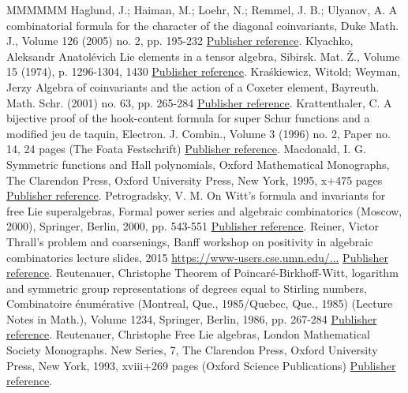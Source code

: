 \begin{thebibliography}{MMMMMM}
 Haglund, J.; Haiman, M.; Loehr, N.; Remmel, J. B.; Ulyanov, A. A combinatorial formula for the character of the diagonal coinvariants, Duke Math. J., Volume 126 (2005) no. 2, pp. 195-232 \href{https://alco.centre-mersenne.org/articles/10.5802/alco.421/#HHLRU}{Publisher reference}.
 Klyachko, Aleksandr Anatolévich Lie elements in a tensor algebra, Sibirsk. Mat. Ž., Volume 15 (1974), p. 1296-1304, 1430 \href{https://alco.centre-mersenne.org/articles/10.5802/alco.421/#Kly}{Publisher reference}.
 Kraśkiewicz, Witold; Weyman, Jerzy Algebra of coinvariants and the action of a Coxeter element, Bayreuth. Math. Schr. (2001) no. 63, pp. 265-284 \href{https://alco.centre-mersenne.org/articles/10.5802/alco.421/#KW}{Publisher reference}.
 Krattenthaler, C. A bijective proof of the hook-content formula for super Schur functions and a modified jeu de taquin, Electron. J. Combin., Volume 3 (1996) no. 2, Paper no. 14, 24 pages (The Foata Festschrift) \href{https://alco.centre-mersenne.org/articles/10.5802/alco.421/#Kratt}{Publisher reference}.
 Macdonald, I. G. Symmetric functions and Hall polynomials, Oxford Mathematical Monographs, The Clarendon Press, Oxford University Press, New York, 1995, x+475 pages \href{https://alco.centre-mersenne.org/articles/10.5802/alco.421/#Mac}{Publisher reference}.
 Petrogradsky, V. M. On Witt’s formula and invariants for free Lie superalgebras, Formal power series and algebraic combinatorics (Moscow, 2000), Springer, Berlin, 2000, pp. 543-551 \href{https://alco.centre-mersenne.org/articles/10.5802/alco.421/#Pet}{Publisher reference}.
 Reiner, Victor Thrall’s problem and coarsenings, Banff workshop on positivity in algebraic combinatorics lecture slides, 2015 \url{https://www-users.cse.umn.edu/...} \href{https://alco.centre-mersenne.org/articles/10.5802/alco.421/#Rei}{Publisher reference}.
 Reutenauer, Christophe Theorem of Poincaré-Birkhoff-Witt, logarithm and symmetric group representations of degrees equal to Stirling numbers, Combinatoire énumérative (Montreal, Que., 1985/Quebec, Que., 1985) (Lecture Notes in Math.), Volume 1234, Springer, Berlin, 1986, pp. 267-284 \href{https://alco.centre-mersenne.org/articles/10.5802/alco.421/#Reu-idemp}{Publisher reference}.
 Reutenauer, Christophe Free Lie algebras, London Mathematical Society Monographs. New Series, 7, The Clarendon Press, Oxford University Press, New York, 1993, xviii+269 pages (Oxford Science Publications) \href{https://alco.centre-mersenne.org/articles/10.5802/alco.421/#Reu}{Publisher reference}.

\end{thebibliography}

